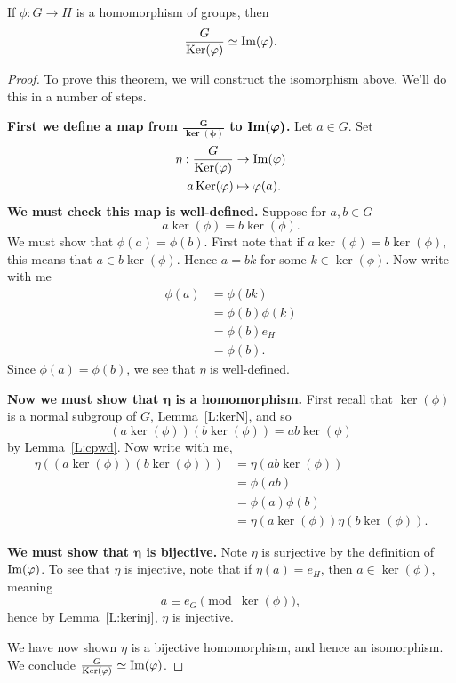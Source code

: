 \documentclass{ximera}
\begin{document}
\begin{theorem}\label{T:NI}
  If $\phi:G\to H$ is a homomorphism of groups, then
  \[
  \frac{G}{\mathop{\mathrm{Ker}}\nolimits(\varphi)} \simeq \operatorname{Im}(\varphi).
  \]
  \begin{proof}
    To prove this theorem, we will construct the isomorphism
    above. We'll do this in a number of steps.


    \textbf{First we define a map from
      $\boldsymbol{\frac{G}{\ker(\phi)}}$ to
      $\boldsymbol{\operatorname{Im}(\varphi)}$.}  Let $a\in G$. Set
    \begin{align*}
      \eta: \frac{G}{\mathop{\mathrm{Ker}}\nolimits(\varphi)} &\to \operatorname{Im}(\varphi)\\
      a\mathop{\mathrm{Ker}}\nolimits(\varphi) &\mapsto \varphi(a).
    \end{align*}
    \textbf{We must check this map is
      well-defined.} Suppose for $a,b\in G$
    \[
    a \ker(\phi) = b\ker(\phi).
    \]
    We must show that $\phi(a) = \phi(b)$. First note that if $a
    \ker(\phi) = b\ker(\phi)$, this means that $a\in
    b\ker(\phi)$. Hence $a = bk$ for some $k\in\ker(\phi)$. Now write
    with me
    \begin{align*}
      \phi(a) &=\phi(bk)\\
      &=\phi(b)\phi(k)\\
      &=\phi(b) e_H\\
      &=\phi(b).
    \end{align*}
    Since $\phi(a) = \phi(b)$, we see that $\eta$ is well-defined.


    
    \textbf{Now we must show that $\boldsymbol\eta$ is a
      homomorphism.} First recall that $\ker(\phi)$ is a normal
    subgroup of $G$, Lemma~\ref{L:kerN}, and so
    \[
    (a\ker(\phi)) (b\ker(\phi))  =  ab\ker(\phi)
    \]
    by Lemma~\ref{L:cpwd}.  Now write with me,
    \begin{align*}
    \eta\left((a\ker(\phi))( b\ker(\phi))\right) &= \eta(ab\ker(\phi))\\
    &= \phi(ab)\\
    &= \phi(a)\phi(b)\\
    &= \eta(a\ker(\phi)) \eta(b\ker(\phi)).
    \end{align*}



    \textbf{We must show that $\boldsymbol\eta$ is bijective.} Note
    $\eta$ is surjective by the definition of $\operatorname{Im}(\varphi)$.  To see that
    $\eta$ is injective, note that if $\eta(a) = e_H$, then $a\in
    \ker(\phi)$, meaning
    \[
    a\equiv e_G \pmod{\ker(\phi)},
    \]
    hence by Lemma~\ref{L:kerinj}, $\eta$ is injective.

    We have now shown $\eta$ is a bijective homomorphism, and hence an
    isomorphism. We conclude $\frac{G}{\mathop{\mathrm{Ker}}\nolimits(\varphi)} \simeq \operatorname{Im}(\varphi)$.
  \end{proof}
\end{theorem}
\end{document}
